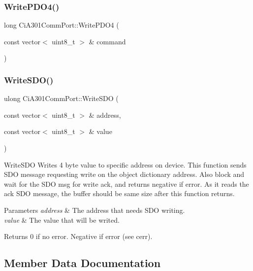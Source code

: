 \subsubsection{\texorpdfstring{Write\+P\+D\+O4()}{WritePDO4()}}
{\footnotesize\ttfamily long Ci\+A301\+Comm\+Port\+::\+Write\+P\+D\+O4 (\begin{DoxyParamCaption}\item[{const vector$<$ uint8\+\_\+t $>$ \&}]{command }\end{DoxyParamCaption})}

\mbox{\label{classCiA301CommPort_a7c55c89b1ccd80dd008240ce3e0409c5}} 
\subsubsection{\texorpdfstring{Write\+S\+D\+O()}{WriteSDO()}}
{\footnotesize\ttfamily ulong Ci\+A301\+Comm\+Port\+::\+Write\+S\+DO (\begin{DoxyParamCaption}\item[{const vector$<$ uint8\+\_\+t $>$ \&}]{address,  }\item[{const vector$<$ uint8\+\_\+t $>$ \&}]{value }\end{DoxyParamCaption})}



Write\+S\+DO Writes 4 byte value to specific address on device. This function sends S\+DO message requesting write on the object dictionary address. Also block and wait for the S\+DO msg for write ack, and returns negative if error. As it reads the ack S\+DO message, the buffer should be same size after this function returns. 


\begin{DoxyParams}{Parameters}
{\em address} & The address that needs S\+DO writing. \\
\hline
{\em value} & The value that will be writed. \\
\hline
\end{DoxyParams}
\begin{DoxyReturn}{Returns}
0 if no error. Negative if error (see cerr). 
\end{DoxyReturn}


\subsection{Member Data Documentation}
\mbox{\label{classCiA301CommPort_a1ae075d22fc854da21a6e691bb029fc0}} 
